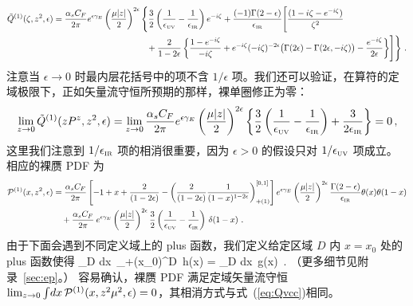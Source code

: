 \begin{widetext}
\begin{align}
\tilde{Q}^{(1)}(\zeta,z^2,\epsilon)
&= {\alpha_sC_F\over 2\pi}e^{\epsilon\gamma_E} \left({\mu|z|\over2}\right)^{2\epsilon} \Bigg\{
 {3\over2}\left({1\over \epsilon_{\mbox{\tiny UV}}}-{1\over \epsilon_{\mbox{\tiny IR}}}\right)e^{-i\zeta}
 +  \frac{(-1)\Gamma(2-\epsilon)}{\epsilon_{\mbox{\tiny IR}}}
  \Biggl[ {(1-i\zeta - e^{-i\zeta})\over \zeta^2}
 \\
& \qquad\qquad\qquad\qquad\qquad\quad 
 +{2\over 1-2\epsilon}\left\{ {1-e^{-i\zeta}\over -i\zeta} + e^{-i\zeta}(-i\zeta)^{-2\epsilon}
 \big(\Gamma(2\epsilon)-\Gamma(2\epsilon,-i\zeta)\big) - \frac{e^{-i\zeta}}{2\epsilon} \right\} \Biggr]
 \Bigg\}\ . \nonumber
\end{align}
注意当 $\epsilon\to 0$ 时最内层花括号中的项不含 $1/\epsilon$ 项。我们还可以验证，在算符的定域极限下，正如矢量流守恒所预期的那样，裸单圈修正为零：
\begin{align} \label{eq:Qvcc}
\lim_{z\to 0} \tilde{Q}^{(1)}(z P^z,z^2,\epsilon)
  = \lim_{z\to 0}  {\alpha_sC_F\over 2\pi}e^{\epsilon\gamma_E} \left({\mu|z|\over2}\right)^{2\epsilon} \bigg\{
 {3\over2}\left({1\over \epsilon_{\mbox{\tiny UV}}}-{1\over \epsilon_{\mbox{\tiny IR}}}\right)
  + \frac{3}{2\epsilon_{\mbox{\tiny IR}}} \bigg\} = 0
 \,,
\end{align}
这里我们注意到 $1/\epsilon_{\mbox{\tiny IR}}$ 项的相消很重要，因为 $\epsilon>0$ 的假设只对 $1/\epsilon_{\mbox{\tiny UV}}$ 项成立。
相应的裸赝 PDF 为
\begin{align}\label{eq:1looppseudo}
{\cal P}^{(1)}(x,z^2,\epsilon)
 &= {\alpha_sC_F\over 2\pi} \left[-1+x + \frac{2}{(1-2\epsilon)} -
 \left( {2\over (1-2\epsilon)}{1\over (1-x)^{1-2\epsilon}}\right)^{[0,1]}_{+(1)}\right]e^{\epsilon\gamma_E}\left({\mu|z|\over2}\right)^{2\epsilon} \frac{\Gamma(2-\epsilon)}{\epsilon_{\mbox{\tiny IR}}} \theta(x)\theta(1-x)\\
 &\quad +{\alpha_sC_F\over 2\pi} \:
  e^{\epsilon\gamma_E}\left({\mu|z|\over2}\right)^{2\epsilon}{3\over2}\left({1\over \epsilon_{\mbox{\tiny UV}}}-{1\over \epsilon_{\mbox{\tiny IR}}}\right)\, \delta(1-x)
 \ .\nonumber
\end{align}
由于下面会遇到不同定义域上的 plus 函数，我们定义给定区域 $D$ 内 $x=x_0$ 处的 plus 函数使得
\beq
	\int_D dx\ \big[ g(x)\big]_{+(x_0)}^D\, h(x) = \int_D dx\ g(x) \left[ h(x) - h(x_0)\right]\,.
\eeq
（更多细节见附录~\ref{sec:ep}。）
容易确认，裸赝 PDF 满足定域矢量流守恒 $\lim_{z\to 0} \int\! dx \, {\cal P}^{(1)}(x,z^2\mu^2,\epsilon) =0$，其相消方式与式~(\ref{eq:Qvcc})相同。


\end{widetext}
